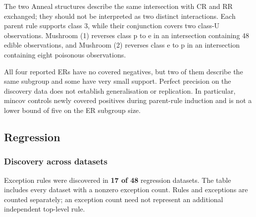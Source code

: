 The two Anneal structures describe the same intersection with CR and RR
exchanged; they should not be interpreted as two distinct interactions.
Each parent rule supports class 3, while their conjunction covers two class-U
observations. Mushroom (1) reverses class p to e in an intersection containing
48 edible observations, and Mushroom (2) reverses class e to p in an
intersection containing eight poisonous observations.

All four reported ERs have no covered negatives, but two of them describe
the same subgroup and some have very small support. Perfect precision on the
discovery data does not establish generalisation or replication. In particular,
mincov controls newly covered positives during parent-rule induction and is
not a lower bound of five on the ER subgroup size.




\subsection{Regression}
\subsubsection{Discovery across datasets}
\label{regression}

\label{discovery-across-datasets-1}
Exception rules were discovered in \textbf{17 of 48} regression datasets.
The table includes every dataset with a nonzero exception
count. Rules and exceptions are counted separately; an exception count
need not represent an additional independent top-level rule.


